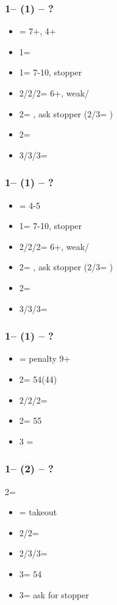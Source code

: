 \documentclass[12pt, a4paper]{report}
\begin{document}
\subsubsection*{1\clubs -- (1\hearts) -- ?}
\begin{itemize}
    \item \dbl = 7+, 4+\spades
    \item 1\spades = \nt
    \item 1\nt = 7-10, \hearts stopper
    \item 2\clubs/2\hearts/2\spades = \trsf{\diams/\spades/\clubs} 6+, weak/\gf
    \item 2\diams = \invp, ask stopper (2\nt/3\clubs = \nf)
    \item 2\nt = \inv
    \item 3\clubs/3\diams/3\spades = \inv
\end{itemize}

\subsubsection*{1\clubs -- (1\spades) -- ?}
\begin{itemize}
    \item \dbl = 4-5\hearts
    \item 1\nt = 7-10, \spades stopper
    \item 2\clubs/2\diams/2\spades = \trsf{\diams/\hearts/\clubs} 6+, weak/\gf
    \item 2\hearts = \invp, ask stopper (2\nt/3\clubs = \nf)
    \item 2\nt = \inv
    \item 3\clubs/3\diams/3\hearts = \inv
\end{itemize}

\subsubsection*{1\clubs -- (1\nt) -- ?}
\begin{itemize}
    \item \dbl = penalty 9+
    \item 2\clubs = 54\major (44)
    \item 2\diams/2\hearts/2\spades = \nf
    \item 2\nt = 55\minor
    \item 3 = \inv\ \unbal
\end{itemize}

\subsubsection*{1\clubs -- (2\diams) -- ?}
2\diams = \diams
\begin{itemize}
    \item \dbl = takeout
    \item 2\hearts/2\spades = \nat\ \nf
    \item 2\nt/3\diams/3\hearts = \trsf{\clubs/\hearts/\spades}\ \invp
    \item 3\clubs = 54\major\ \gf
    \item 3\spades = ask for \diams stopper
\end{itemize}
\end{document}
